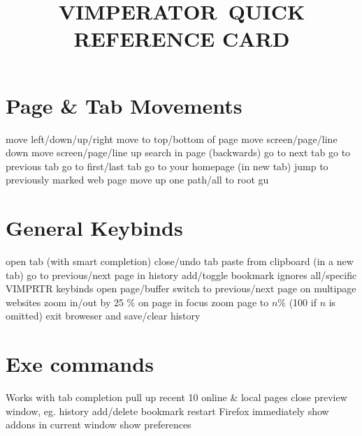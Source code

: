 
\def\content{VIMPERATOR}
\def\versionnumber{1.0}  %


\def\version{v\versionnumber\ \month\ \year}




\title{\uppercase{\content\ quick reference card}}

\shortintro

\vskip 0.5cm

\section{Page \& Tab Movements}{}
	{move left/down/up/right}
	{move to top/bottom of page}
	{move screen/page/line down}
	{move screen/page/line up}
	{search in page (backwards)}
	{go to next tab}
	{go to previous tab}
	{go to first/last tab}
	{go to your homepage (in new tab)}
	{jump to previously marked web page}
	{move up one path/all to root}
	{gu}

\section{General Keybinds}{}
	{open tab (with smart completion)}
	{close/undo tab}
	{paste from clipboard (in a new tab)}
	{go to previous/next page in history}
	{add/toggle bookmark}
	{ignores all/specific VIMPRTR keybinds}
	{open page/buffer}
\cmdS{\lbracket\lbracket~\rbracket\rbracket}	{switch to previous/next page on multipage websites}
\cmdS{+~-}	{zoom in/out by 25 \% on page in focus}
	{zoom page to $n$\% (100 if $n$ is omitted)}
	{exit broweser and save/clear history}

\vfill

\section{Exe commands}{Works with tab completion}
	{pull up recent 10 online \& local pages}
	{close preview window, eg. history}
	{add/delete bookmark}
	{restart Firefox immediately}
	{show addons in current window}
	{show preferences}

